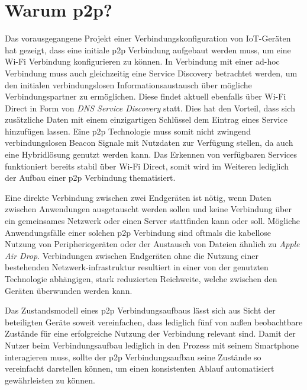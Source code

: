 \section{Warum p2p?}
    Das vorausgegangene Projekt einer Verbindungskonfiguration von IoT-Geräten \linebreak \cite{aiProject} hat gezeigt, dass eine initiale p2p Verbindung aufgebaut werden muss, um eine Wi-Fi Verbindung konfigurieren zu können. In Verbindung mit einer ad-hoc Verbindung muss auch gleichzeitig eine Service Discovery betrachtet werden, um den initialen verbindungslosen Informationsaustausch über mögliche Verbindungspartner zu ermöglichen. Diese  findet aktuell ebenfalls über Wi-Fi Direct in Form von {\it DNS Service Discovery} statt. Dies hat den Vorteil, dass sich zusätzliche Daten mit einem einzigartigen Schlüssel dem Eintrag eines Service hinzufügen lassen. Eine p2p Technologie muss somit nicht zwingend verbindungslosen Beacon Signale mit Nutzdaten zur Verfügung stellen, da auch eine Hybridlösung genutzt werden kann. Das Erkennen von verfügbaren Services funktioniert bereits stabil über Wi-Fi Direct, somit wird im Weiteren lediglich der Aufbau einer p2p Verbindung thematisiert.
    
    Eine direkte Verbindung zwischen zwei Endgeräten ist nötig, wenn Daten zwischen Anwendungen ausgetauscht werden sollen und keine Verbindung über ein gemeinsames Netzwerk oder einen Server stattfinden kann oder soll. Mögliche Anwendungsfälle einer solchen p2p Verbindung sind oftmals die kabellose Nutzung von Peripheriegeräten oder der Austausch von Dateien ähnlich zu {\it Apple Air Drop}. Verbindungen zwischen Endgeräten ohne die Nutzung einer bestehenden Netzwerk-\linebreak infrastruktur resultiert in einer von der genutzten Technologie abhängigen, stark reduzierten Reichweite, welche zwischen den Geräten überwunden werden kann.
    
    Das Zustandsmodell  eines p2p Verbindungsaufbaus lässt sich aus Sicht der beteiligten Geräte soweit vereinfachen, dass lediglich fünf von außen beobachtbare Zustände für eine erfolgreiche Nutzung der Verbindung relevant sind. Damit der Nutzer beim Verbindungsaufbau lediglich in den Prozess mit seinem Smartphone interagieren muss, sollte der p2p Verbindungsaufbau seine Zustände so vereinfacht darstellen können, um einen konsistenten Ablauf automatisiert gewährleisten zu können.
    
